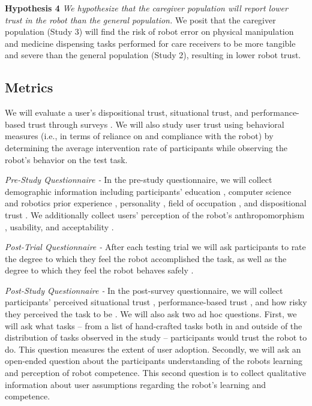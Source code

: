 \documentclass[letterpaper]{article} %
\begin{document}
\textbf{Hypothesis 4} \textit{We hypothesize that the caregiver population will report lower trust in the robot than the general population.} We posit that the caregiver population (Study 3) will find the risk of robot error on physical manipulation and medicine dispensing tasks performed for care receivers to be more tangible and severe than the general population (Study 2), resulting in lower robot trust.

\subsection{Metrics}
\label{sec:metrics}
We will evaluate a user's dispositional trust, situational trust, and performance-based trust through surveys \cite{merritt_i_2013, jian_foundations_2000, malle_multidimensional_2021}. We will also study user trust using behavioral measures (i.e., in terms of reliance on and compliance with the robot) by determining the average intervention rate of participants while observing the robot's behavior on the test task.

\textit{Pre-Study Questionnaire -} In the pre-study questionnaire, we will collect demographic information including participants' education \cite{raub_correlates_nodate}, computer science and robotics prior experience \cite{raub_correlates_nodate}, personality \cite{donnellan_mini-ipip_2006}, field of occupation \cite{noauthor_college_nodate}, and dispositional trust \cite{merritt_i_2013}. We additionally collect users' perception of the robot's anthropomorphism \cite{bartneck_measurement_2009}, usability, and acceptability \cite{belanche_integrating_2012}.

\textit{Post-Trial Questionnaire -}
After each testing trial we will ask participants to rate the degree to which they feel the robot accomplished the task, as well as the degree to which they feel the robot behaves safely \cite{bartneck_measurement_2009}.

\textit{Post-Study Questionnaire -}
In the post-survey questionnaire, we will collect participants' perceived situational trust \cite{jian_foundations_2000}, performance-based trust \cite{malle_multidimensional_2021}, and how risky they perceived the task to be \cite{fischhoff_how_1978}. We will also ask two ad hoc questions. First, we will ask what tasks -- from a list of hand-crafted tasks both in and outside of the distribution of tasks observed in the study -- participants would trust the robot to do. This question measures the extent of user adoption. Secondly, we will ask an open-ended question about the participants understanding of the robots learning and perception of robot competence. This second question is to collect qualitative information about user assumptions regarding the robot's learning and competence.
\end{document}
